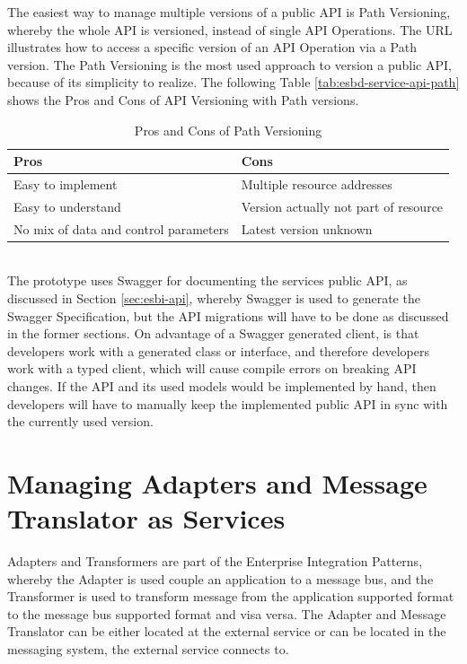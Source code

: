 The easiest way to manage multiple versions of a public API is Path Versioning, whereby the whole API is versioned, instead of single API Operations. The URL  illustrates how to access a specific version of an API Operation via a Path version. The Path Versioning is the most used approach to version a public API, because of its simplicity to realize.  The following Table \vref{tab:esbd-service-api-path} shows the Pros and Cons of API Versioning with Path versions.

{\renewcommand{\arraystretch}{1.2}%
	\begin{table}[h]
		\begin{tabularx}{\textwidth}{ X|X }	
			\textbf{Pros}                         & \textbf{Cons}    \\  \hline
			Easy to implement                     & Multiple resource addresses      \\
			Easy to understand                    & Version actually not part of resource     \\  
			No mix of data and control parameters & Latest version unknown \\ \hline
		\end{tabularx}
		\caption{Pros and Cons of Path Versioning}
		\label{tab:esbd-service-api-path}
\end{table}}
\ \\
The prototype uses Swagger for documenting the services public API, as discussed in Section \vref{sec:esbi-api}, whereby Swagger is used to generate the Swagger Specification, but the API migrations will have to be done as discussed in the former sections. On advantage of a Swagger generated client, is that developers work with a generated class or interface, and therefore developers work with a typed client, which will cause compile errors on breaking API changes. If the API and its used models would be implemented by hand, then developers will have to manually keep the implemented public API in sync with the currently used version.

\section{Managing Adapters and Message Translator as Services}
\label{sec:esbd-adap-trans-service}
Adapters and Transformers are part of the Enterprise Integration Patterns, whereby the Adapter is used couple an application to a message bus, and the Transformer is used to transform message from the application supported format to the message bus supported format and visa versa. The Adapter and Message Translator can be either located at the external service or can be located in the messaging system, the external service connects to. \\

